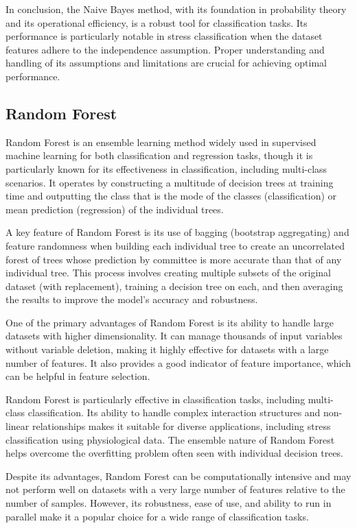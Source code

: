 In conclusion, the Naive Bayes method, with its foundation in probability theory and its operational efficiency, is a robust tool for classification tasks. Its performance is particularly notable in stress classification when the dataset features adhere to the independence assumption. Proper understanding and handling of its assumptions and limitations are crucial for achieving optimal performance.


\subsection*{Random Forest}

Random Forest is an ensemble learning method widely used in supervised machine learning for both classification and regression tasks, though it is particularly known for its effectiveness in classification, including multi-class scenarios. It operates by constructing a multitude of decision trees at training time and outputting the class that is the mode of the classes (classification) or mean prediction (regression) of the individual trees. 

A key feature of Random Forest is its use of bagging (bootstrap aggregating) and feature randomness when building each individual tree to create an uncorrelated forest of trees whose prediction by committee is more accurate than that of any individual tree. This process involves creating multiple subsets of the original dataset (with replacement), training a decision tree on each, and then averaging the results to improve the model's accuracy and robustness.

One of the primary advantages of Random Forest is its ability to handle large datasets with higher dimensionality. It can manage thousands of input variables without variable deletion, making it highly effective for datasets with a large number of features. It also provides a good indicator of feature importance, which can be helpful in feature selection.

Random Forest is particularly effective in classification tasks, including multi-class classification. Its ability to handle complex interaction structures and non-linear relationships makes it suitable for diverse applications, including stress classification using physiological data. The ensemble nature of Random Forest helps overcome the overfitting problem often seen with individual decision trees.

Despite its advantages, Random Forest can be computationally intensive and may not perform well on datasets with a very large number of features relative to the number of samples. However, its robustness, ease of use, and ability to run in parallel make it a popular choice for a wide range of classification tasks.

